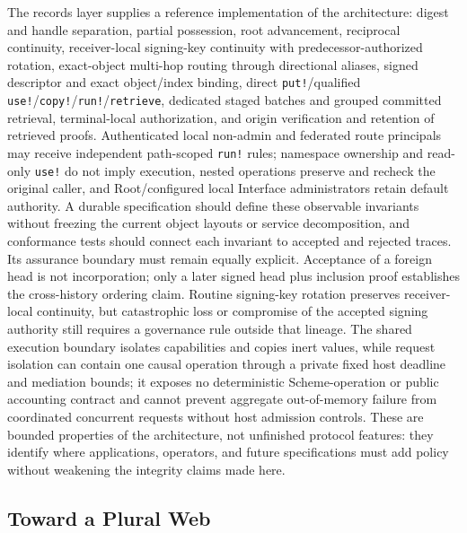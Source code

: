 The records layer supplies a reference implementation of the architecture: digest and handle separation, partial possession, root advancement, reciprocal continuity, receiver-local signing-key continuity with predecessor-authorized rotation, exact-object multi-hop routing through directional aliases, signed descriptor and exact object/index binding, direct \texttt{put!}/qualified \texttt{use!}/\texttt{copy!}/\texttt{run!}/\texttt{retrieve}, dedicated staged batches and grouped committed retrieval, terminal-local authorization, and origin verification and retention of retrieved proofs. Authenticated local non-admin and federated route principals may receive independent path-scoped \texttt{run!} rules; namespace ownership and read-only \texttt{use!} do not imply execution, nested operations preserve and recheck the original caller, and Root/configured local Interface administrators retain default authority. A durable specification should define these observable invariants without freezing the current object layouts or service decomposition, and conformance tests should connect each invariant to accepted and rejected traces. Its assurance boundary must remain equally explicit. Acceptance of a foreign head is not incorporation; only a later signed head plus inclusion proof establishes the cross-history ordering claim. Routine signing-key rotation preserves receiver-local continuity, but catastrophic loss or compromise of the accepted signing authority still requires a governance rule outside that lineage. The shared execution boundary isolates capabilities and copies inert values, while request isolation can contain one causal operation through a private fixed host deadline and mediation bounds; it exposes no deterministic Scheme-operation or public accounting contract and cannot prevent aggregate out-of-memory failure from coordinated concurrent requests without host admission controls. These are bounded properties of the architecture, not unfinished protocol features: they identify where applications, operators, and future specifications must add policy without weakening the integrity claims made here.

\subsection{Toward a Plural Web}


